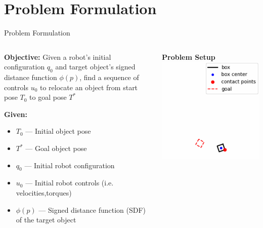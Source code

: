 \documentclass[10pt, aspectratio=169]{beamer}
\begin{document}
\section{Problem Formulation}
\begin{frame}{Problem Formulation}
  \begin{columns}[T]
    \begin{column}{0.6\textwidth}
        \textbf{Objective:} Given a robot's initial configuration $q_0$ and target object's signed distance function $\phi(p)$, find a sequence of controls $u_{0}$ to relocate an object from start pose $T_0$ to goal pose $T^*$
        \medskip

        \textbf{Given:}
        \begin{itemize}
            \item $T_0$ — Initial object pose
            \item $T^*$ — Goal object pose
            \item $q_0$ — Initial robot configuration
            \item $u_{0}$ — Initial robot controls (i.e. velocities,torques)
            \item $\phi(p)$ — Signed distance function (SDF) of the target object  
        \end{itemize}
    \end{column}

    \begin{column}{0.4\textwidth}
      \centering
      {\bfseries Problem Setup}\\[0.5em]
      \includegraphics[width=\textwidth]{Figures/problem_formulation.png}
    \end{column}
  \end{columns}
\end{frame}
\end{document}
